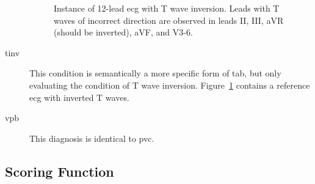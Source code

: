 \documentclass[\main/thesis.tex]{subfiles}
\begin{document}
\begin{description}
    \begin{figure}[ht]
        \centering
        \caption{Instance of 12-lead \gls{ecg} with T wave inversion. Leads with T waves of incorrect direction are observed in leads II, III, aVR (should be inverted), aVF, and V3-6.}
        \label{fig:full_TInv}
    \end{figure}
    \item[\gls{tinv}] This condition is semantically a more specific form of \gls{tab}, but only evaluating the condition of T wave inversion.
    Figure~\ref{fig:full_TInv} contains a reference \gls{ecg} with inverted T waves.

    \item[\gls{vpb}] This diagnosis is identical to \gls{pvc}.
\end{description}

\subsection{Scoring Function}


\end{document}
